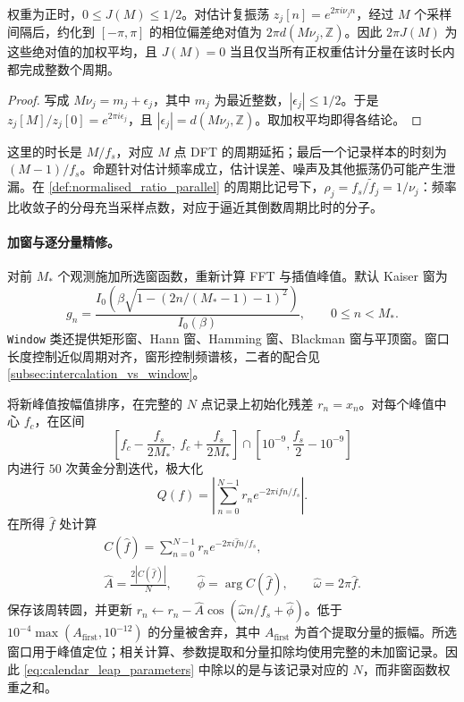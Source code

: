 \begin{proposition}[窗口代价的相位解释]\label{prop:calendar_leap_phase_cost}
权重为正时，\(0\le J(M)\le1/2\)。对估计复振荡 \(z_j[n]=e^{2\pi i\nu_j n}\)，经过 \(M\) 个采样间隔后，约化到 \([-\pi,\pi]\) 的相位偏差绝对值为 \(2\pi d(M\nu_j,\mathbb Z)\)。因此 \(2\pi J(M)\) 为这些绝对值的加权平均，且 \(J(M)=0\) 当且仅当所有正权重估计分量在该时长内都完成整数个周期。
\end{proposition}
\begin{proof}
写成 \(M\nu_j=m_j+\epsilon_j\)，其中 \(m_j\) 为最近整数，\(|\epsilon_j|\le1/2\)。于是 \(z_j[M]/z_j[0]=e^{2\pi i\epsilon_j}\)，且 \(|\epsilon_j|=d(M\nu_j,\mathbb Z)\)。取加权平均即得各结论。
\end{proof}
这里的时长是 \(M/f_s\)，对应 \(M\) 点 DFT 的周期延拓；最后一个记录样本的时刻为 \((M-1)/f_s\)。命题针对估计频率成立，估计误差、噪声及其他振荡仍可能产生泄漏。在 \cref{def:normalised_ratio_parallel} 的周期比记号下，\(\rho_j=f_s/\widetilde f_j=1/\nu_j\)：频率比收敛子的分母充当采样点数，对应于逼近其倒数周期比时的分子。

\paragraph{加窗与逐分量精修。}
对前 \(M_*\) 个观测施加所选窗函数，重新计算 FFT 与插值峰值。默认 Kaiser 窗为
\[
g_n=\frac{I_0\!\left(\beta\sqrt{1-(2n/(M_*-1)-1)^2}\right)}{I_0(\beta)},
\qquad 0\le n<M_*.
\]
\texttt{Window} 类还提供矩形窗、Hann 窗、Hamming 窗、Blackman 窗与平顶窗。窗口长度控制近似周期对齐，窗形控制频谱核，二者的配合见 \cref{subsec:intercalation_vs_window}。

将新峰值按幅值排序，在完整的 \(N\) 点记录上初始化残差 \(r_n=x_n\)。对每个峰值中心 \(f_c\)，在区间
\[
\left[f_c-\frac{f_s}{2M_*},\ f_c+\frac{f_s}{2M_*}\right]
\cap\left[10^{-9},\frac{f_s}{2}-10^{-9}\right]
\]
内进行 \(50\) 次黄金分割迭代，极大化
\[
Q(f)=\left|\sum_{n=0}^{N-1}r_n e^{-2\pi i f n/f_s}\right|.
\]
在所得 \(\widehat f\) 处计算
\begin{equation}\label{eq:calendar_leap_parameters}
\begin{gathered}
C(\widehat f)=\sum_{n=0}^{N-1}r_n e^{-2\pi i\widehat f n/f_s},\\
\widehat A=\frac{2|C(\widehat f)|}{N},\qquad
\widehat\phi=\arg C(\widehat f),\qquad
\widehat\omega=2\pi\widehat f.
\end{gathered}
\end{equation}
保存该周转圆，并更新 \(r_n\leftarrow r_n-\widehat A\cos(\widehat\omega n/f_s+\widehat\phi)\)。低于 \(10^{-4}\max(A_{\mathrm{first}},10^{-12})\) 的分量被舍弃，其中 \(A_{\mathrm{first}}\) 为首个提取分量的振幅。所选窗口用于峰值定位；相关计算、参数提取和分量扣除均使用完整的未加窗记录。因此 \cref{eq:calendar_leap_parameters} 中除以的是与该记录对应的 \(N\)，而非窗函数权重之和。

